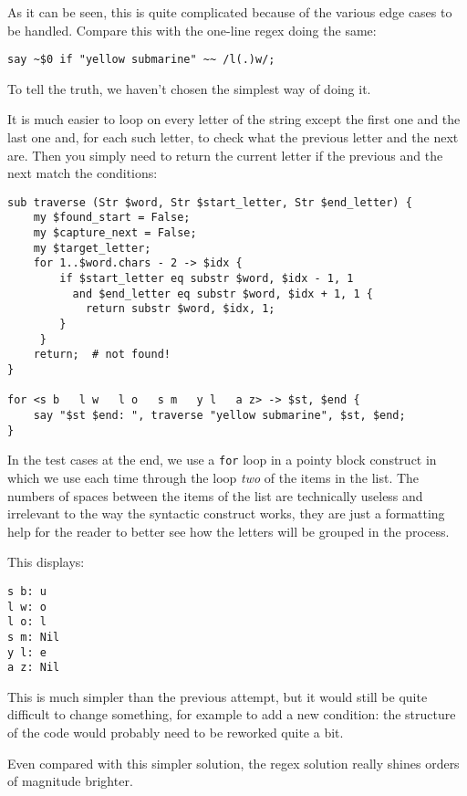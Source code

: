 As it can be seen, this is quite complicated because of 
the various edge cases to be handled. Compare this with 
the one-line regex doing the same:

\begin{verbatim}
say ~$0 if "yellow submarine" ~~ /l(.)w/;
\end{verbatim}

To tell the truth, we haven't chosen the simplest way of 
doing it.

It is much easier to loop on every letter of the string 
except the first one and the last one and, for each such 
letter, to check what the previous letter and the next 
are. Then you simply need to return the current letter if 
the previous and the next match the conditions:

\begin{verbatim}
sub traverse (Str $word, Str $start_letter, Str $end_letter) {
    my $found_start = False;
    my $capture_next = False;
    my $target_letter;
    for 1..$word.chars - 2 -> $idx {
        if $start_letter eq substr $word, $idx - 1, 1
          and $end_letter eq substr $word, $idx + 1, 1 {
            return substr $word, $idx, 1;
        }
     }
    return;  # not found!
}          

for <s b   l w   l o   s m   y l   a z> -> $st, $end {
    say "$st $end: ", traverse "yellow submarine", $st, $end;  
}
\end{verbatim}

In the test cases at the end, we use a {\tt for} loop in a 
pointy block construct in which we use each time through the 
loop \emph{two} of the items in the list. The numbers of 
spaces between the items of the list are technically useless 
and irrelevant to the 
way the syntactic construct works, they are just a formatting 
help for the reader to better see how the letters will 
be grouped in the process.

This displays:
\begin{verbatim}
s b: u
l w: o
l o: l
s m: Nil
y l: e
a z: Nil
\end{verbatim}

This is much simpler than the previous attempt, but it would 
still be quite difficult to change something, for example 
to add a new condition: the structure of the code would 
probably need to be reworked quite a bit.

Even compared with this simpler solution, the regex solution 
really shines orders of magnitude brighter.


